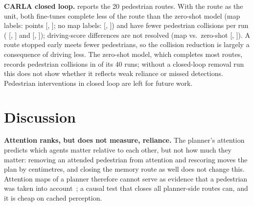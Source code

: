 \documentclass[journal]{IEEEtran}
\begin{document}
\textbf{CARLA closed loop.}  reports the 20 pedestrian routes. With the route as the unit, both
fine-tunes complete less of the route than the zero-shot model (map labels: \CrMapZsRc{} points [\CrMapZsRcLo,
\CrMapZsRcHi]; no map labels: \CrEthZsRc{} [\CrEthZsRcLo, \CrEthZsRcHi]) and have fewer pedestrian collisions per run
(\CrMapZsPc{} [\CrMapZsPcLo, \CrMapZsPcHi] and \CrEthZsPc{} [\CrEthZsPcLo, \CrEthZsPcHi]); driving-score differences are
not resolved (map vs.\ zero-shot \CrMapZsDs{} [\CrMapZsDsLo, \CrMapZsDsHi]). A route stopped early meets fewer
pedestrians, so the collision reduction is largely a consequence of driving less. The zero-shot model, which completes
most routes, records \CrZsEvents{} pedestrian collisions in \CrZsRuns{} of its 40 runs; without a
closed-loop removal run this does not show whether it reflects weak reliance or missed detections. Pedestrian interventions in closed loop are left for future work.

\begin{table}[t]
\centering
\caption{CARLA closed loop on the 20 Bench2Drive pedestrian routes, two repetitions each (40 runs per model). DS =
driving score, RC = route completion (\%), succ.\ = success rate (\%); collisions are event counts over 40 runs.}
\label{tab:carla}
\footnotesize
\setlength{\tabcolsep}{2pt}
\end{table}

\section{Discussion}
\textbf{Attention ranks, but does not measure, reliance.} The planner's attention predicts which agents matter
relative to each other, but not how much they matter: removing an attended pedestrian from attention and rescoring moves
the plan by centimetres, and closing the memory route as well does not change this. Attention maps of a planner therefore cannot serve as evidence that a pedestrian was taken into
account~\cite{jain2019attention,wiegreffe2019attention}; a causal test that closes all planner-side routes can, and it
is cheap on cached perception.
\end{document}
